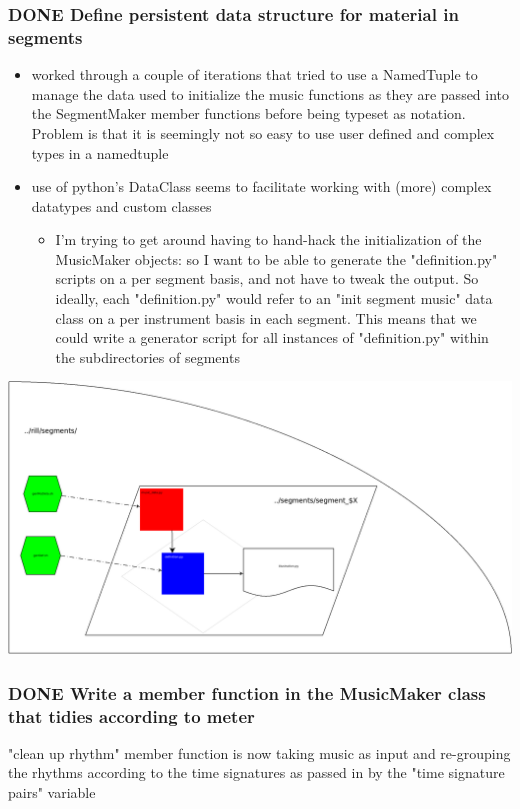 \documentclass[11pt]{article}
\begin{document}
\subsubsection*{{\bfseries\sffamily DONE} Define persistent data structure for material in segments}
\label{sec:org82822e6}
\begin{itemize}
\item worked through a couple of iterations that tried to use a NamedTuple to manage the data used to initialize the music functions as they are passed into the SegmentMaker member functions before being typeset as notation. Problem is that it is seemingly not so easy to use user defined and complex types in a namedtuple

\item use of python's DataClass seems to facilitate working with (more) complex datatypes and custom classes

\begin{itemize}
\item I'm trying to get around having to hand-hack the initialization of the MusicMaker objects: so I want to be able to generate the "definition.py" scripts on a per segment basis, and not have to tweak the output. So ideally, each "definition.py" would refer to an "init segment music" data class on a per instrument basis in each segment. This means that we could write a generator script for all instances of "definition.py" within the subdirectories of segments
\end{itemize}
\end{itemize}
\begin{center}
\includegraphics[width=.9\linewidth]{./segment_DataFlow.png}
\end{center}
\subsubsection*{{\bfseries\sffamily DONE} Write a member function in the MusicMaker class that tidies according to meter}
\label{sec:org4792e86}
"clean up rhythm" member function is now taking music as input and re-grouping the rhythms according to the time signatures as passed in by the "time signature pairs" variable
\end{document}

